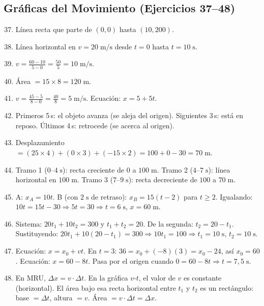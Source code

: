 \documentclass[12pt, a4paper]{article}
\begin{document}
\subsection*{Gráficas del Movimiento (Ejercicios 37--48)}

\begin{enumerate}[leftmargin=*, label=\textbf{\arabic*.}]
  \setcounter{enumi}{36}
  \item Línea recta que parte de $(0, 0)$ hasta $(10, 200)$.

  \item Línea horizontal en $v = 20\;\text{m/s}$ desde $t = 0$ hasta $t = 10\;\text{s}$.

  \item $v = \frac{60 - 10}{5 - 0} = \frac{50}{5} = 10\;\text{m/s}$.

  \item Área $= 15 \times 8 = 120\;\text{m}$.

  \item $v = \frac{45 - 5}{8 - 0} = \frac{40}{8} = 5\;\text{m/s}$. Ecuación: $x = 5 + 5t$.

  \item Primeros 5\,s: el objeto avanza (se aleja del origen). Siguientes 3\,s: está en reposo. Últimos 4\,s: retrocede (se acerca al origen).

  \item Desplazamiento $= (25 \times 4) + (0 \times 3) + (-15 \times 2) = 100 + 0 - 30 = 70\;\text{m}$.

  \item Tramo 1 ($0$–$4\;\text{s}$): recta creciente de $0$ a $100\;\text{m}$. Tramo 2 ($4$–$7\;\text{s}$): línea horizontal en $100\;\text{m}$. Tramo 3 ($7$–$9\;\text{s}$): recta decreciente de $100$ a $70\;\text{m}$.

  \item A: $x_A = 10t$. B (con $2\;\text{s}$ de retraso): $x_B = 15(t - 2)$ para $t \geq 2$. Igualando: $10t = 15t - 30 \Rightarrow 5t = 30 \Rightarrow t = 6\;\text{s}$, $x = 60\;\text{m}$.

  \item Sistema: $20t_1 + 10t_2 = 300$ y $t_1 + t_2 = 20$. De la segunda: $t_2 = 20 - t_1$. Sustituyendo: $20t_1 + 10(20 - t_1) = 300 \Rightarrow 10t_1 = 100 \Rightarrow t_1 = 10\;\text{s}$, $t_2 = 10\;\text{s}$.

  \item Ecuación: $x = x_0 + vt$. En $t = 3$: $36 = x_0 + (-8)(3) = x_0 - 24$, así $x_0 = 60$. Ecuación: $x = 60 - 8t$. Pasa por el origen cuando $0 = 60 - 8t \Rightarrow t = 7{,}5\;\text{s}$.

  \item En MRU, $\Delta x = v \cdot \Delta t$. En la gráfica $v$-$t$, el valor de $v$ es constante (horizontal). El área bajo esa recta horizontal entre $t_1$ y $t_2$ es un rectángulo: base $= \Delta t$, altura $= v$. Área $= v \cdot \Delta t = \Delta x$.
\end{enumerate}
\end{document}
